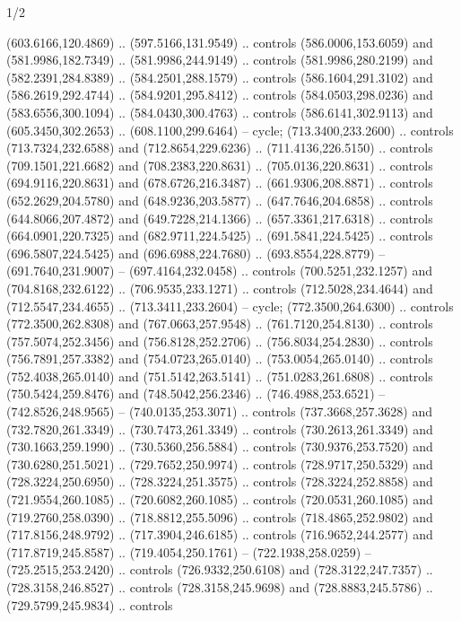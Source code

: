 \begin{flagdescription}{1/2}
\begin{scope}[shift={(2*\flaglength/3-0.25*\rb,0.51333\flagwidth)},scale=0.001715\flagwidth*\stretchfactor]
\begin{scope}[y=-1pt, x=1pt,cm={{1.04354,0.0,0.0,1.01818,(-827,-297)}}]
\begin{scope}[draw=black,line width=0.015\flagwidth]
\begin{scope}[fill=gold]
  (603.6166,120.4869) .. (597.5166,131.9549) .. controls (586.0006,153.6059) and
  (581.9986,182.7349) .. (581.9986,244.9149) .. controls (581.9986,280.2199) and
  (582.2391,284.8389) .. (584.2501,288.1579) .. controls (586.1604,291.3102) and
  (586.2619,292.4744) .. (584.9201,295.8412) .. controls (584.0503,298.0236) and
  (583.6556,300.1094) .. (584.0430,300.4763) .. controls (586.6141,302.9113) and
  (605.3450,302.2653) .. (608.1100,299.6464) -- cycle;
 (713.3400,233.2600) .. controls (713.7324,232.6588) and
  (712.8654,229.6236) .. (711.4136,226.5150) .. controls (709.1501,221.6682) and
  (708.2383,220.8631) .. (705.0136,220.8631) .. controls (694.9116,220.8631) and
  (678.6726,216.3487) .. (661.9306,208.8871) .. controls (652.2629,204.5780) and
  (648.9236,203.5877) .. (647.7646,204.6858) .. controls (644.8066,207.4872) and
  (649.7228,214.1366) .. (657.3361,217.6318) .. controls (664.0901,220.7325) and
  (682.9711,224.5425) .. (691.5841,224.5425) .. controls (696.5807,224.5425) and
  (696.6988,224.7680) .. (693.8554,228.8779) -- (691.7640,231.9007) --
  (697.4164,232.0458) .. controls (700.5251,232.1257) and (704.8168,232.6122) ..
  (706.9535,233.1271) .. controls (712.5028,234.4644) and (712.5547,234.4655) ..
  (713.3411,233.2604) -- cycle;
 (772.3500,264.6300) .. controls (772.3500,262.8308) and
  (767.0663,257.9548) .. (761.7120,254.8130) .. controls (757.5074,252.3456) and
  (756.8128,252.2706) .. (756.8034,254.2830) .. controls (756.7891,257.3382) and
  (754.0723,265.0140) .. (753.0054,265.0140) .. controls (752.4038,265.0140) and
  (751.5142,263.5141) .. (751.0283,261.6808) .. controls (750.5424,259.8476) and
  (748.5042,256.2346) .. (746.4988,253.6521) -- (742.8526,248.9565) --
  (740.0135,253.3071) .. controls (737.3668,257.3628) and (732.7820,261.3349) ..
  (730.7473,261.3349) .. controls (730.2613,261.3349) and (730.1663,259.1990) ..
  (730.5360,256.5884) .. controls (730.9376,253.7520) and (730.6280,251.5021) ..
  (729.7652,250.9974) .. controls (728.9717,250.5329) and (728.3224,250.6950) ..
  (728.3224,251.3575) .. controls (728.3224,252.8858) and (721.9554,260.1085) ..
  (720.6082,260.1085) .. controls (720.0531,260.1085) and (719.2760,258.0390) ..
  (718.8812,255.5096) .. controls (718.4865,252.9802) and (717.8156,248.9792) ..
  (717.3904,246.6185) .. controls (716.9652,244.2577) and (717.8719,245.8587) ..
  (719.4054,250.1761) -- (722.1938,258.0259) -- (725.2515,253.2420) .. controls
  (726.9332,250.6108) and (728.3122,247.7357) .. (728.3158,246.8527) .. controls
  (728.3158,245.9698) and (728.8883,245.5786) .. (729.5799,245.9834) .. controls

\end{scope}
\end{scope}
\end{scope}
\end{scope}
\end{flagdescription}
